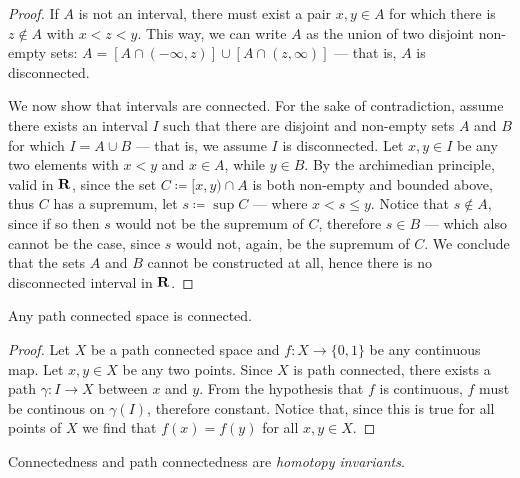 \begin{proof}
If \(A\) is not an interval, there must exist a pair \(x, y \in A\) for which
there is \(z \notin A\) with \(x < z < y\). This way, we can write \(A\) as the
union of two disjoint non-empty sets:
\(A = [A \cap (-\infty, z)] \cup [A \cap (z, \infty)]\) --- that is, \(A\) is
disconnected.

We now show that intervals are connected. For the sake of contradiction, assume
there exists an interval \(I\) such that there are disjoint and non-empty sets
\(A\) and \(B\) for which \(I = A \cup B\) --- that is, we assume \(I\) is
disconnected. Let \(x, y \in I\) be any two elements with \(x < y\) and
\(x \in A\), while \(y \in B\). By the archimedian principle, valid in \(\mathbf{R}\),
since the set \(C \coloneq [x, y) \cap A\) is both non-empty and bounded above,
thus \(C\) has a supremum, let \(s \coloneq \sup C\) --- where \(x < s \leq
y\). Notice that \(s \notin A\), since if so then \(s\) would not be the
supremum of \(C\), therefore \(s \in B\) --- which also cannot be the case,
since \(s\) would not, again, be the supremum of \(C\). We conclude that the
sets \(A\) and \(B\) cannot be constructed at all, hence there is no
disconnected interval in \(\mathbf{R}\).
\end{proof}

\begin{proposition}
\label{prop:path-connected-is-connected}
Any path connected space is connected.
\end{proposition}

\begin{proof}
Let \(X\) be a path connected space and \(f: X \to \{0, 1\}\) be any continuous
map. Let \(x, y \in X\) be any two points. Since \(X\) is path connected, there
exists a path \(\gamma: I \to X\) between \(x\) and \(y\). From the hypothesis
that \(f\) is continuous, \(f\) must be continous on \(\gamma(I)\), therefore
constant. Notice that, since this is true for all points of \(X\) we find that
\(f(x) = f(y)\) for all \(x, y \in X\).
\end{proof}

\begin{proposition}
\label{prop:path-conn-htpy-invariant}
Connectedness and path connectedness are \emph{homotopy invariants}.
\end{proposition}

